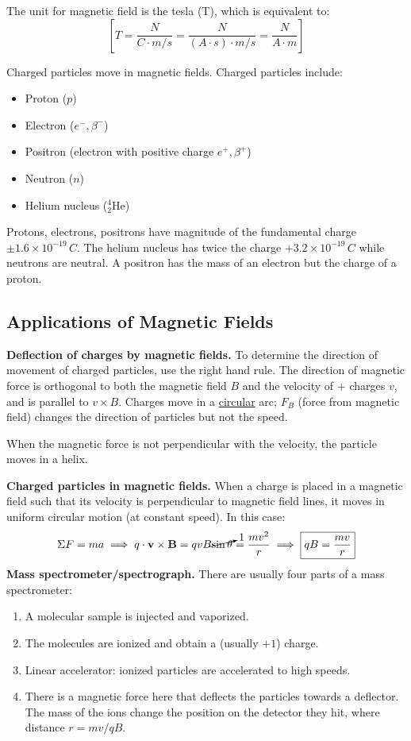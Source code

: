 \documentclass{article}
\begin{document}
The unit for magnetic field is the tesla (T), which is equivalent to:
\begin{equation*}
	\left[ \si{T}
	=\frac{\si{N}}{\si{C\cdot m/s}}
	=\frac{\si{N}}{\si{(A\cdot s)\cdot m/s}}
	=\frac{\si{N}}{\si{A\cdot m}} \right]
\end{equation*}

Charged particles move in magnetic fields. Charged particles include:
\begin{itemize}
	\item Proton ($p$)
	\item Electron ($e^-,\beta^-$)
	\item Positron (electron with positive charge $e^+,\beta^+$)
	\item Neutron ($n$)
	\item Helium nucleus ($_2^4$He)
\end{itemize}
Protons, electrons, positrons have magnitude of the fundamental charge $\pm 1.6\times 10^{-19}\,\si{C}$. The helium nucleus has twice the charge $+3.2\times 10^{-19}\,\si{C}$ while neutrons are neutral. A positron has the mass of an electron but the charge of a proton.

\subsection{Applications of Magnetic Fields}

\textbf{Deflection of charges by magnetic fields.} To determine the direction of movement of charged particles, use the right hand rule. The direction of magnetic force is orthogonal to both the magnetic field $B$ and the velocity of $+$ charges $v$, and is parallel to $v\times B$. Charges move in a \ul{circular} arc; $F_B$ (force from magnetic field) changes the direction of particles but not the speed.

When the magnetic force is not perpendicular with the velocity, the particle moves in a helix.

\textbf{Charged particles in magnetic fields.} When a charge is placed in a magnetic field such that its velocity is perpendicular to magnetic field lines, it moves in uniform circular motion (at constant speed). In this case:
\begin{equation*}
    \Sigma F=ma
	\implies q\cdot\mathbf{v}\times\mathbf{B}=qvB\cancelto1{\sin\theta}=\frac{mv^2}{r}
	\implies \boxed{qB=\frac{mv}{r}}
\end{equation*}
\textbf{Mass spectrometer/spectrograph.} 
There are usually four parts of a mass spectrometer:
\begin{enumerate}
	\item A molecular sample is injected and vaporized.
	\item The molecules are ionized and obtain a (usually $+1$) charge.
	\item Linear accelerator: ionized particles are accelerated to high speeds.
	\item There is a magnetic force here that deflects the particles towards a deflector. The mass of the ions change the position on the detector they hit, where distance $r=mv/qB$.
\end{enumerate}
\end{document}
